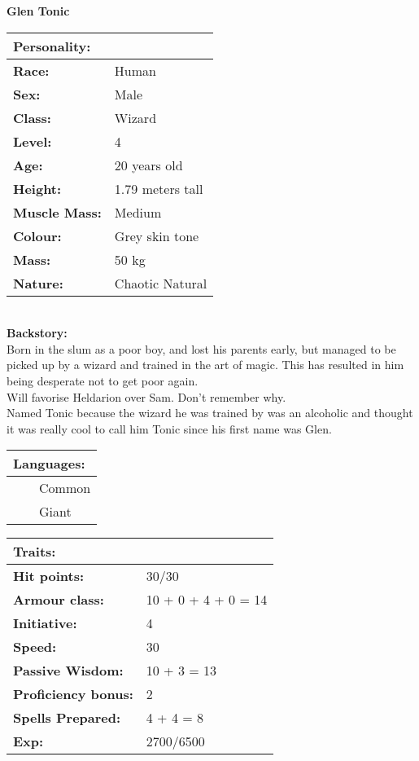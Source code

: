 \documentclass[11pt]{article}
\newcommand{\tabitem}{~~\llap{--}~~}
\begin{document}
	\begin{center}
\Huge \textbf{Glen Tonic}
	\end{center}
	\begin{multicols}{2}
\noindent \begin{tabularx}{95mm}{@{}l l}
\Large \textbf{Personality:} 	& 					\\
\hline
\textbf{Race:} 					& Human 			\\
\textbf{Sex:} 					& Male 				\\
\textbf{Class:}					& Wizard			\\
\textbf{Level:} 				& 4 	 			\\
\textbf{Age:} 					& 20 years old 		\\
\textbf{Height:} 				& 1.79 meters tall 	\\
\textbf{Muscle Mass:} 			& Medium 			\\
\textbf{Colour:} 				& Grey skin tone 	\\
\textbf{Mass:} 					& 50 kg 			\\
\textbf{Nature:} 				& Chaotic Natural
		\end{tabularx} \\
\textbf{Backstory:} \\
Born in the slum as a poor boy, and lost his parents early, but managed to be picked up by a wizard and trained in the art of magic. This has resulted in him being desperate not to get poor again. \\
Will favorise Heldarion over Sam. Don't remember why. \\
Named Tonic because the wizard he was trained by was an alcoholic and thought it was really cool to call him Tonic since his first name was Glen. \\

\noindent \begin{tabularx}{95mm}{@{}l}
{\Large \textbf{Languages:}} \\
\hline
\tabitem Common \\
\tabitem Giant
		\end{tabularx}

\vspace{4mm}

\noindent \begin{tabularx}{95mm}{@{}l l}
\Large \textbf{Traits:}		 	& 							\\
\hline
\textbf{Hit points:} 			& 30/30 					\\
\textbf{Armour class:} 			& 10 + 0 + 4 + 0 = 14 		\\
\textbf{Initiative:} 			& 4	 						\\
\textbf{Speed:} 				& 30		 				\\
\textbf{Passive Wisdom:} 		& 10 + 3 = 13	 			\\
\textbf{Proficiency bonus:}		& 2							\\
\textbf{Spells Prepared:} 		& 4 + 4 = 8		 			\\
\textbf{Exp:} 					& 2700/6500
		\end{tabularx}


\end{multicols}
\end{document}
